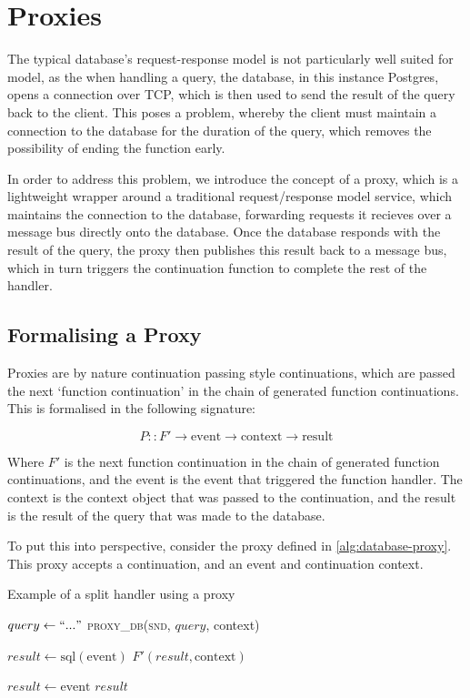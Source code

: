 \section{Proxies}
The typical database's request-response model is not particularly well suited for \faaas{} model, as the when handling a query, the database, in this instance Postgres, opens a connection over TCP, which is then used to send the result of the query back to the client. This poses a problem, whereby the client must maintain a connection to the database for the duration of the query, which removes the possibility of ending the function early.

In order to address this problem, we introduce the concept of a proxy, which is a lightweight wrapper around a traditional request/response model service, which maintains the connection to the database, forwarding requests it recieves over a message bus directly onto the database. Once the database responds with the result of the query, the proxy then publishes this result back to a message bus, which in turn triggers the continuation function to complete the rest of the handler.

\subsection{Formalising a Proxy}
Proxies are by nature continuation passing style continuations, which are passed the next `function continuation' in the chain of generated function continuations. This is formalised in the following signature:

\begin{signature}[Proxy]
$$P :: F' \rightarrow \textrm{event} \rightarrow \textrm{context} \rightarrow \textrm{result}$$
\end{signature}

Where $F'$ is the next function continuation in the chain of generated function continuations, and the event is the event that triggered the function handler. The context is the context object that was passed to the continuation, and the result is the result of the query that was made to the database.

To put this into perspective, consider the proxy defined in \ref{alg:database-proxy}. This proxy accepts a continuation, and an event and continuation context.

\begin{algorithm}
\caption{Example of a split handler using a proxy}
\label{alg:database-proxy}
\begin{algorithmic}[1]
    \State $query \gets ``..."$
    \State \Return \textsc{proxy_db}(\textsc{snd}, $query$, context)
\EndFunction

    \State $result \gets \textrm{sql}(\textrm{event})$
    \State \Return $F'(result, \textrm{context})$
\EndFunction

    \State $result \gets \textrm{event}$
    \State \Return $result$
\EndFunction
\end{algorithmic}
\end{algorithm}

